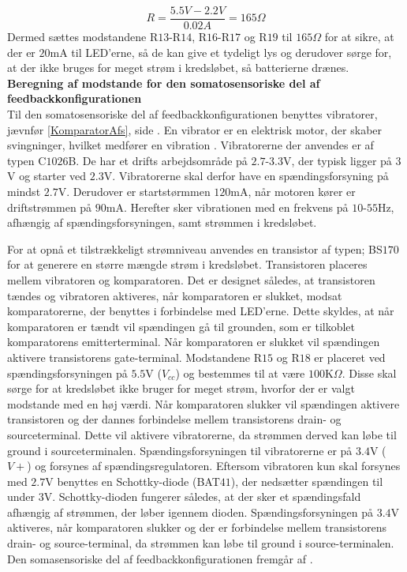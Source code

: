 \begin{equation}
R = \dfrac{5.5V - 2.2V}{0.02A} = 165\Omega
\end{equation}
\noindent Dermed sættes modstandene R$13$-R$14$, R$16$-R$17$ og R$19$ til $165\Omega$ for at sikre, at der er $20$mA til LED'erne, så de kan give et tydeligt lys og derudover sørge for, at der ikke bruges for meget strøm i kredsløbet, så batterierne drænes. \\



\noindent\textbf{Beregning af modstande for den somatosensoriske del af feedbackkonfigurationen} \\
Til den somatosensoriske del af feedbackkonfigurationen benyttes vibratorer, jævnfør \ref{KomparatorAfs}, side \pageref{KomparatorAfs}. En vibrator er en elektrisk motor, der skaber svingninger, hvilket medfører en vibration \cite{Redaktionen2009}. Vibratorerne der anvendes er af typen C$1026$B. De har et drifts arbejdsområde på $2.7$-$3.3$V, der typisk ligger på $3$V og starter ved $2.3$V. Vibratorerne skal derfor have en spændingsforsyning på mindst $2.7$V. Derudover er startstørmmen $120$mA, når motoren kører er driftstrømmen på $90$mA. Herefter sker vibrationen med en frekvens på $10$-$55$Hz, afhængig af spændingsforsyningen, samt strømmen i kredsløbet. \cite{Machinery2009} %

For at opnå et tilstrækkeligt strømniveau anvendes en transistor af typen; BS$170$ for at generere en større mængde strøm i kredsløbet. Transistoren placeres mellem vibratoren og komparatoren. Det er designet således, at transistoren tændes og vibratoren aktiveres, når komparatoren er slukket, modsat komparatorerne, der benyttes i forbindelse med LED'erne. Dette skyldes, at når komparatoren er tændt vil spændingen gå til grounden, som er tilkoblet komparatorens emitterterminal. Når komparatoren er slukket vil spændingen aktivere transistorens gate-terminal. Modstandene R$15$ og R$18$ er placeret ved spændingsforsyningen på $5.5$V ($V_{cc}$) og bestemmes til at være $100$K$\Omega$. Disse skal sørge for at kredsløbet ikke bruger for meget strøm, hvorfor der er valgt modstande med en høj værdi. Når komparatoren slukker vil spændingen aktivere transistoren og der dannes forbindelse mellem transistorens drain- og sourceterminal. Dette vil aktivere vibratorerne, da strømmen derved kan løbe til ground i sourceterminalen. Spændingsforsyningen til vibratorerne er på $3.4$V ($V+$) og forsynes af spændingsregulatoren. Eftersom vibratoren kun skal forsynes med $2.7$V benyttes en Schottky-diode (BAT$41$), der nedsætter spændingen til under $3$V. Schottky-dioden fungerer således, at der sker et spændingsfald afhængig af strømmen, der løber igennem dioden. Spændingsforsyningen på $3.4$V aktiveres, når komparatoren slukker og der er forbindelse mellem transistorens drain- og source-terminal, da strømmen kan løbe til ground i source-terminalen. Den somasensoriske del af feedbackkonfigurationen fremgår af .
 

